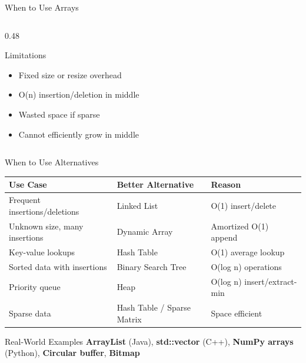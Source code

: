 \documentclass[aspectratio=169,xcolor=dvipsnames]{beamer}
\begin{document}
\begin{frame}{When to Use Arrays}
\begin{columns}
\begin{column}{0.48\textwidth}
      \begin{alertblock}{Limitations}
        \begin{itemize}
          \item[$\times$] Fixed size or resize overhead
          \item[$\times$] O(n) insertion/deletion in middle
          \item[$\times$] Wasted space if sparse
          \item[$\times$] Cannot efficiently grow in middle
        \end{itemize}
      \end{alertblock}
    \end{column}
  \end{columns}
\end{frame}

\begin{frame}{When to Use Alternatives}
  \begin{center}
    \begin{tabular}{p{4cm}|p{3.5cm}|p{3.5cm}}
      \toprule
      \textbf{Use Case} & \textbf{Better Alternative} & \textbf{Reason} \\
      \midrule
      Frequent insertions/deletions & Linked List & O(1) insert/delete \\
      \midrule
      Unknown size, many insertions & Dynamic Array & Amortized O(1) append \\
      \midrule
      Key-value lookups & Hash Table & O(1) average lookup \\
      \midrule
      Sorted data with insertions & Binary Search Tree & O(log n) operations \\
      \midrule
      Priority queue & Heap & O(log n) insert/extract-min \\
      \midrule
      Sparse data & Hash Table / Sparse Matrix & Space efficient \\
      \bottomrule
    \end{tabular}
  \end{center}

  \vspace{0.5cm}

  \begin{exampleblock}{Real-World Examples}
    \textbf{ArrayList} (Java), \textbf{std::vector} (C++), \textbf{NumPy arrays} (Python), \textbf{Circular buffer}, \textbf{Bitmap}
  \end{exampleblock}
\end{frame}
\end{document}
